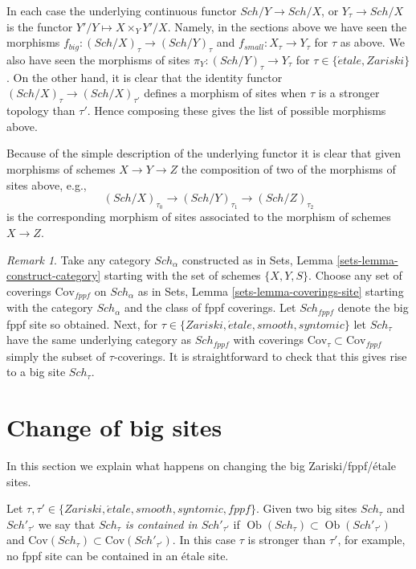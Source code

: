 \documentclass{stacks-project}
\theoremstyle{plain}
\theoremstyle{definition}
\theoremstyle{remark}
\newtheorem{remark}[subsection]{Remark}
\numberwithin{equation}{subsection}
\def\Sch{\mathit{Sch}}
\def\Ob{\mathop{\mathrm{Ob}}\nolimits}
\def\etale{{\acute{e}tale}}
\begin{document}
In each case the underlying continuous functor
$\Sch/Y \to \Sch/X$, or
$Y_\tau \to \Sch/X$
is the functor $Y'/Y \mapsto X \times_Y Y'/X$. Namely, in the sections
above we have seen the morphisms
$f_{big} : (\Sch/X)_\tau \to (\Sch/Y)_\tau$
and
$f_{small} : X_\tau \to Y_\tau$
for $\tau$ as above.
We also have seen the morphisms of sites
$\pi_Y : (\Sch/Y)_\tau \to Y_\tau$ for
$\tau \in \{\etale, Zariski\}$.
On the other hand, it is clear that the identity functor
$(\Sch/X)_\tau \to (\Sch/X)_{\tau'}$ defines
a morphism of sites when $\tau$ is a stronger topology than
$\tau'$. Hence composing these gives the list of possible morphisms
above.

\medskip\noindent
Because of the simple description of the underlying functor it
is clear that given morphisms of schemes $X \to Y \to Z$ the
composition of two of the morphisms of sites above, e.g.,
$$
(\Sch/X)_{\tau_0} \longrightarrow
(\Sch/Y)_{\tau_1} \longrightarrow
(\Sch/Z)_{\tau_2}
$$
is the corresponding morphism of sites associated to the morphism
of schemes $X \to Z$.

\begin{remark}
\label{remark-choice-sites}
Take any category $\Sch_\alpha$ constructed as in
Sets, Lemma \ref{sets-lemma-construct-category}
starting with the set of schemes $\{X, Y, S\}$. Choose any set of
coverings $\text{Cov}_{fppf}$ on $\Sch_\alpha$ as in
Sets, Lemma \ref{sets-lemma-coverings-site}
starting with the category $\Sch_\alpha$ and the class of fppf
coverings. Let $\Sch_{fppf}$ denote the big fppf site so
obtained. Next, for $\tau \in \{Zariski, \etale, smooth, syntomic\}$
let $\Sch_\tau$ have the same underlying category as
$\Sch_{fppf}$ with coverings
$\text{Cov}_\tau \subset \text{Cov}_{fppf}$ simply the subset of
$\tau$-coverings. It is straightforward to check that this gives rise
to a big site $\Sch_\tau$.
\end{remark}









\section{Change of big sites}
\label{section-change-alpha}

\noindent
In this section we explain what happens on changing the big
Zariski/fppf/\'etale sites.

\medskip\noindent
Let $\tau, \tau' \in \{Zariski, \etale, smooth, syntomic, fppf\}$.
Given two big sites $\Sch_\tau$ and $\Sch'_{\tau'}$
we say that
{\it $\Sch_\tau$ is contained in $\Sch'_{\tau'}$} if
$\Ob(\Sch_\tau) \subset \Ob(\Sch'_{\tau'})$
and
$\text{Cov}(\Sch_\tau) \subset \text{Cov}(\Sch'_{\tau'})$.
In this case $\tau$ is stronger than $\tau'$, for example, no fppf
site can be contained in an \'etale site.
\end{document}
